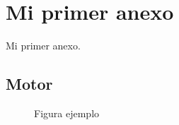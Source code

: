 \appendix %
\chapter{Mi primer anexo} \label{anexoA}

Mi primer anexo.
\newpage

\section{Motor}

\begin{figure}[h!]
	\centering
	\caption{Figura ejemplo}
	\label{FiguraA_01}
\end{figure}


